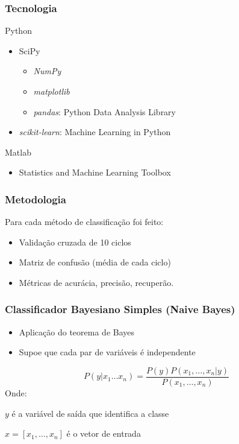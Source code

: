 \documentclass{beamer}
\begin{document}
\begin{frame}
\frametitle{Tecnologia}
\begin{block}{Python}
\begin{itemize}
\item SciPy
	\begin{itemize}
	\item \textit{NumPy}
	\item \textit{matplotlib}
	\item \textit{pandas}: Python Data Analysis Library
	\end{itemize}
\item \textit{scikit-learn}: Machine Learning in Python
\end{itemize}
\end{block}

\begin{block}{Matlab}
\begin{itemize}
\item Statistics and Machine Learning Toolbox
\end{itemize}
\end{block}

\end{frame}


\begin{frame}
\frametitle{Metodologia}
Para cada método de classificação foi feito:
\begin{itemize}
\item Validação cruzada de 10 ciclos
\item Matriz de confusão (média de cada ciclo)
\item Métricas de acurácia, precisão, recuperão. 
\end{itemize}
\end{frame}


\begin{frame}
\frametitle{Classificador Bayesiano Simples (Naive Bayes)}
\begin{itemize} 
\item Aplicação do teorema de Bayes
\item Supoe que cada par de variáveis é independente
\end{itemize}

\begin{theorem}
\[P(y|x_1 \dots x_n)  = \frac{P(y)P(x_1, \dots, x_n|y)}{P(x_1,\dots, x_n)}\]
Onde:

$y$ é a variável de saída que identifica a classe

$x = [x_1, \dots, x_n] $ é o vetor de entrada 

\end{theorem}

\end{frame}
\end{document}
